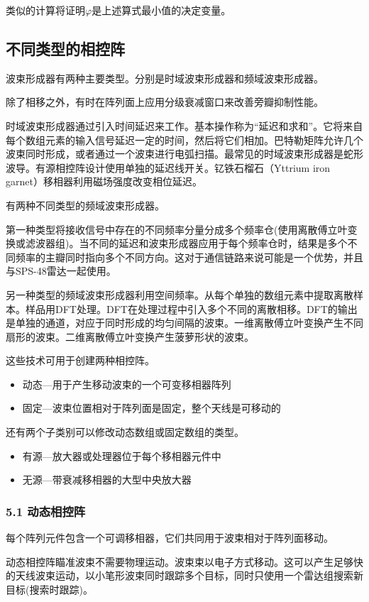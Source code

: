 类似的计算将证明$\varphi$是上述算式最小值的决定变量。

\subsection{不同类型的相控阵}
波束形成器有两种主要类型。分别是时域波束形成器和频域波束形成器。

除了相移之外，有时在阵列面上应用分级衰减窗口来改善旁瓣抑制性能。

时域波束形成器通过引入时间延迟来工作。基本操作称为“延迟和求和”。它将来自每个数组元素的输入信号延迟一定的时间，然后将它们相加。巴特勒矩阵允许几个波束同时形成，或者通过一个波束进行电弧扫描。最常见的时域波束形成器是蛇形波导。有源相控阵设计使用单独的延迟线开关。钇铁石榴石（Yttrium iron garnet）移相器利用磁场强度改变相位延迟。

有两种不同类型的频域波束形成器。

第一种类型将接收信号中存在的不同频率分量分成多个频率仓(使用离散傅立叶变换或滤波器组)。当不同的延迟和波束形成器应用于每个频率仓时，结果是多个不同频率的主瓣同时指向多个不同方向。这对于通信链路来说可能是一个优势，并且与SPS-48雷达一起使用。

另一种类型的频域波束形成器利用空间频率。从每个单独的数组元素中提取离散样本。样品用DFT处理。DFT在处理过程中引入多个不同的离散相移。DFT的输出是单独的通道，对应于同时形成的均匀间隔的波束。一维离散傅立叶变换产生不同扇形的波束。二维离散傅立叶变换产生菠萝形状的波束。

这些技术可用于创建两种相控阵。
\begin{itemize}
\item 动态—用于产生移动波束的一个可变移相器阵列
\item 固定—波束位置相对于阵列面是固定，整个天线是可移动的
\end{itemize}
还有两个子类别可以修改动态数组或固定数组的类型。
\begin{itemize}
\item 有源—放大器或处理器位于每个移相器元件中
\item 无源—带衰减移相器的大型中央放大器
\end{itemize}

\subsubsection{5.1 动态相控阵}
每个阵列元件包含一个可调移相器，它们共同用于波束相对于阵列面移动。

动态相控阵瞄准波束不需要物理运动。波束束以电子方式移动。这可以产生足够快的天线波束运动，以小笔形波束同时跟踪多个目标，同时只使用一个雷达组搜索新目标(搜索时跟踪)。

